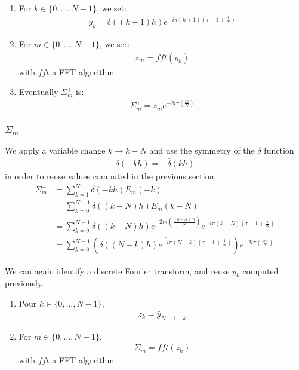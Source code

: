 \begin{enumerate}
\item For $k\in\{0,\hdots,N-1\}$, we set:
\begin{align}
y_{k}=\delta((k+1)h)e^{-i\pi (k+1)\left(\tau-1+\frac{1}{N}\right)}
\end{align}
\item For $m \in\{0,\hdots,N-1\}$, we set:
\begin{align}
  z_{m}=fft(y_{k})
\end{align}
with $fft$ a FFT algorithm
\item Eventually $\Sigma_{m}^{+}$ is:
\begin{align*}
  \Sigma_{m}^{+}=z_{m}e^{-2i\pi\left(\frac{m}{N}\right)}
\end{align*}
\end{enumerate}

\subsubsection{$\Sigma_{m}^{-}$}

We apply a variable change $k \rightarrow k-N$ and use the symmetry of the $\delta$ function
\begin{align*}
\delta(-kh)=&\bar{\delta}(kh)
\end{align*}
in order to reuse values computed in the previous section:
\begin{align*}
\Sigma_{m}^{-}&=\sum_{k=1}^{N}\delta(-kh)E_{m}(-k)\\
  &=\sum_{k=0}^{N-1}\delta((k-N)h)E_{m}(k-N)\\
  &=\sum_{k=0}^{N-1}\delta((k-N)h) e^{-2i\pi\left(\frac{(k-N) m}{N}\right)}e^{-i\pi (k-N)\left(\tau-1+\frac{1}{N}\right)}\\
  &=\sum_{k=0}^{N-1}\left(\overline{\delta((N-k)h) e^{-i\pi (N-k)\left(\tau-1+\frac{1}{N}\right)}}\right) e^{-2i\pi\left(\frac{k m}{N}\right)} 
\end{align*}

We can again identify a discrete Fourier transform, and reuse $y_k$ computed previously.
\begin{enumerate}
\item Pour $k\in\{0,\hdots,N-1\}$,
\begin{align}
z_{k}= \bar{y}_{N-1-k}
\end{align}
\item For $m \in\{0,\hdots,N-1\}$,
\begin{align}
  \Sigma_{m}^{-}=fft(z_{k})
\end{align}
with $fft$ a FFT algorithm
\end{enumerate}

